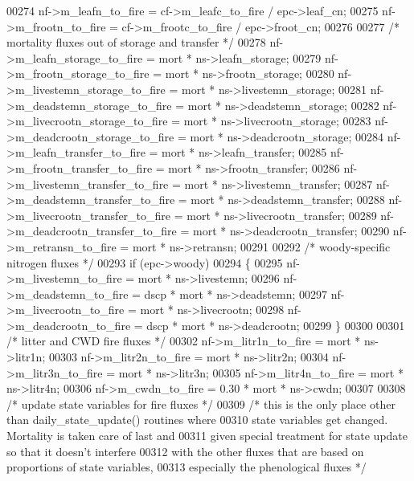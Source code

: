 \begin{DoxyCode}
00274     nf->m\_leafn\_to\_fire = cf->m\_leafc\_to\_fire / epc->leaf\_cn;   
00275     nf->m\_frootn\_to\_fire = cf->m\_frootc\_to\_fire / epc->froot\_cn;    
00276     
00277     \textcolor{comment}{/* mortality fluxes out of storage and transfer */}
00278     nf->m\_leafn\_storage\_to\_fire  = mort * ns->leafn\_storage;
00279     nf->m\_frootn\_storage\_to\_fire  = mort * ns->frootn\_storage;
00280     nf->m\_livestemn\_storage\_to\_fire  = mort * ns->livestemn\_storage;
00281     nf->m\_deadstemn\_storage\_to\_fire  = mort * ns->deadstemn\_storage;
00282     nf->m\_livecrootn\_storage\_to\_fire  = mort * ns->livecrootn\_storage;
00283     nf->m\_deadcrootn\_storage\_to\_fire  = mort * ns->deadcrootn\_storage;
00284     nf->m\_leafn\_transfer\_to\_fire = mort * ns->leafn\_transfer;
00285     nf->m\_frootn\_transfer\_to\_fire = mort * ns->frootn\_transfer;
00286     nf->m\_livestemn\_transfer\_to\_fire = mort * ns->livestemn\_transfer;
00287     nf->m\_deadstemn\_transfer\_to\_fire = mort * ns->deadstemn\_transfer;
00288     nf->m\_livecrootn\_transfer\_to\_fire = mort * ns->livecrootn\_transfer;
00289     nf->m\_deadcrootn\_transfer\_to\_fire = mort * ns->deadcrootn\_transfer;
00290     nf->m\_retransn\_to\_fire = mort * ns->retransn;
00291     
00292     \textcolor{comment}{/* woody-specific nitrogen fluxes */}
00293     \textcolor{keywordflow}{if} (epc->woody)
00294     \{
00295         nf->m\_livestemn\_to\_fire = mort * ns->livestemn; 
00296         nf->m\_deadstemn\_to\_fire = dscp * mort * ns->deadstemn;
00297         nf->m\_livecrootn\_to\_fire =  mort * ns->livecrootn;
00298         nf->m\_deadcrootn\_to\_fire =  dscp * mort * ns->deadcrootn;
00299     \}
00300     
00301     \textcolor{comment}{/* litter and CWD fire fluxes */}
00302     nf->m\_litr1n\_to\_fire = mort * ns->litr1n;
00303     nf->m\_litr2n\_to\_fire = mort * ns->litr2n;
00304     nf->m\_litr3n\_to\_fire = mort * ns->litr3n;
00305     nf->m\_litr4n\_to\_fire = mort * ns->litr4n;
00306     nf->m\_cwdn\_to\_fire =   0.30 * mort * ns->cwdn;
00307     
00308     \textcolor{comment}{/* update state variables for fire fluxes */}
00309     \textcolor{comment}{/* this is the only place other than daily\_state\_update() routines where}
00310 \textcolor{comment}{    state variables get changed.  Mortality is taken care of last and }
00311 \textcolor{comment}{    given special treatment for state update so that it doesn't interfere}
00312 \textcolor{comment}{    with the other fluxes that are based on proportions of state variables,}
00313 \textcolor{comment}{    especially the phenological fluxes */}

\end{DoxyCode}
